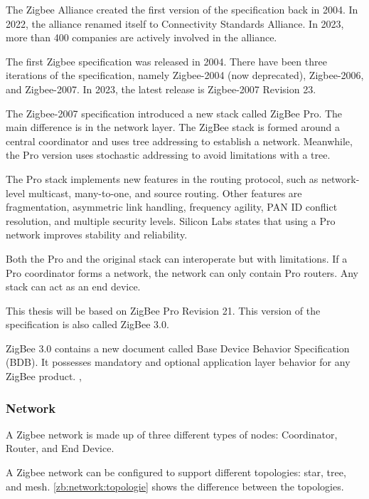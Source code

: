 The Zigbee Alliance created the first version of the specification back in 2004.
In 2022, the alliance renamed itself to Connectivity Standards Alliance.
In 2023, more than 400 companies are actively involved in the alliance. \cite{csa:members}

The first Zigbee specification was released in 2004.
There have been three iterations of the specification, namely Zigbee-2004 (now deprecated), Zigbee-2006, and Zigbee-2007.
In 2023, the latest release is Zigbee-2007 Revision 23.

The Zigbee-2007 specification introduced a new stack called ZigBee Pro. The main difference is in the network layer.
The ZigBee stack is formed around a central coordinator and uses tree addressing to establish a network. Meanwhile,
the Pro version uses stochastic addressing to avoid limitations with a tree. \cite{zigbee:silabs:ug103:2}

The Pro stack implements new features in the routing protocol, such as network-level multicast, many-to-one, and source routing.
Other features are fragmentation, asymmetric link handling, frequency agility, PAN ID conflict resolution, and multiple security levels.
Silicon Labs states that using a Pro network improves stability and reliability.

Both the Pro and the original stack can interoperate but with limitations.
If a Pro coordinator forms a network, the network can only contain Pro routers.
Any stack can act as an end device. \cite{zigbee:silabs:ug103:2}

This thesis will be based on ZigBee Pro Revision 21. This version of the specification is also called ZigBee 3.0.

ZigBee 3.0 contains a new document called Base Device Behavior Specification (BDB).
It possesses mandatory and optional application layer behavior for any ZigBee product. \cite{ti:new:19}, \cite{10.1145/3098243.3098254}

\subsubsection{Network}
\label{zb:net:intro}

A Zigbee network is made up of three different types of nodes: Coordinator, Router, and End Device. \cite{Whitehurst:14}

A Zigbee network can be configured to support different topologies: star, tree, and mesh. \autoref{zb:network:topologie} shows the difference between the topologies.

